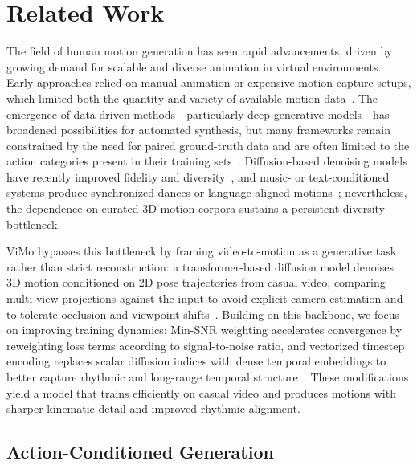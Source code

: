 \section{Related Work}

The field of human motion generation has seen rapid advancements, driven by growing demand for scalable and diverse animation in virtual environments. Early approaches relied on manual animation or expensive motion-capture setups, which limited both the quantity and variety of available motion data~\cite{amass2019}. The emergence of data-driven methods—particularly deep generative models—has broadened possibilities for automated synthesis, but many frameworks remain constrained by the need for paired ground-truth data and are often limited to the action categories present in their training sets~\cite{edge2023, motiondiffuse2022}. Diffusion-based denoising models have recently improved fidelity and diversity~\cite{ddpm2020}, and music- or text-conditioned systems produce synchronized dances or language-aligned motions~\cite{motiondiffuse2022, edge2023, aist2021}; nevertheless, the dependence on curated 3D motion corpora sustains a persistent diversity bottleneck.

ViMo bypasses this bottleneck by framing video-to-motion as a generative task rather than strict reconstruction: a transformer-based diffusion model denoises 3D motion conditioned on 2D pose trajectories from casual video, comparing multi-view projections against the input to avoid explicit camera estimation and to tolerate occlusion and viewpoint shifts~\cite{vimo2024}. Building on this backbone, we focus on improving training dynamics: Min-SNR weighting accelerates convergence by reweighting loss terms according to signal-to-noise ratio, and vectorized timestep encoding replaces scalar diffusion indices with dense temporal embeddings to better capture rhythmic and long-range temporal structure~\cite{minsnr2024, ptss2024}. These modifications yield a model that trains efficiently on casual video and produces motions with sharper kinematic detail and improved rhythmic alignment.

\subsection{Action-Conditioned Generation}

